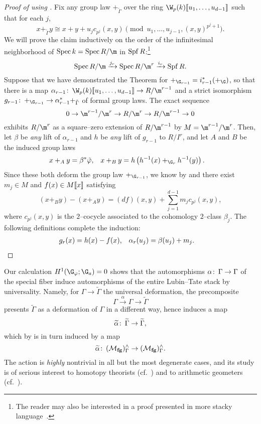 \begin{proof}[{Proof of  using }]
Fix any group law \(+_{\tilde \Gamma}\) over the ring \(\W_p(k)\ps{u_1, \ldots, u_{d-1}}\) such that for each \(j\), \[x +_{\tilde \Gamma} y \cong x + y + u_j c_{p^j}(x, y) \pmod{u_1, \ldots, u_{j-1}, (x, y)^{p^j+1}}.\]  We will prove the claim inductively on the order of the infinitesimal neighborhood of \(\Spec k = \Spec R / \m\) in \(\operatorname{Spf} R\):\footnote{The reader may also be interested in a proof presented in more stacky language~\cite[Reduction to Theorem 21.5]{LurieChromaticCourseNotes}.} \[\Spec R / \m \xrightarrow{j_r} \Spec R/\m^r \xrightarrow{i_r} \Spf R.\]  Suppose that we have demonstrated the Theorem for \(+_{\G_{r-1}} = i_{r-1}^* (+_{\G})\), so that there is a map \(\alpha_{r-1}\co \W_p(k)\ps{u_1, \ldots, u_{d-1}} \to R/\m^{r-1}\) and a strict isomorphism \(g_{r-1}\co +_{\G_{r-1}} \to \alpha_{r-1}^* +_{\tilde \Gamma}\) of formal group laws.  The exact sequence \[0 \to \m^{r-1} / \m^r \to R/\m^r \to R/\m^{r-1} \to 0\] exhibits \(R/\m^r\) as a square--zero extension of \(R/\m^{r-1}\) by \(M = \m^{r-1} / \m^r\).  Then, let \(\beta\) be \emph{any} lift of \(\alpha_{r-1}\) and \(h\) be \emph{any} lift of \(g_{r-1}\) to \(R/I^r\), and let \(A\) and \(B\) be the induced group laws
\begin{align*}
x +_A y & = \beta^* \tilde \phi, &
x +_B y & = h\left( h^{-1}(x) +_{\G_r} h^{-1}(y) \right).
\end{align*}
Since these both deform the group law \(+_{\G_{r-1}}\), we know by  and  there exist \(m_j \in M\) and \(f(x) \in M\llbracket{x}\rrbracket\) satisfying \[(x +_B y) - (x +_A y) = (df)(x, y) + \sum_{j=1}^{d-1} m_j c_{p^j}(x, y),\] where \(c_{p^j}(x, y)\) is the \(2\)--cocycle associated to the cohomology \(2\)--class \(\beta_j\).  The following definitions complete the induction:
\begin{align*}
g_r(x) & = h(x) - f(x), &
\alpha_r(u_j) & = \beta(u_j) + m_j. \qedhere
\end{align*}
\end{proof}

\begin{remark}\label{ActionBySnLiftsToLTn}
Our calculation \(H^1(\G_\phi; \G_a) = 0\) shows that the automorphisms \(\alpha\colon\thinspace \Gamma \to \Gamma\) of the special fiber induce automorphisms of the entire Lubin--Tate stack by universality.  Namely, for \(\Gamma \to \widetilde \Gamma\) the universal deformation, the precomposite \[\Gamma \xrightarrow{\alpha} \Gamma \to \widetilde \Gamma\] presents \(\widetilde \Gamma\) as a deformation of \(\Gamma\) in a different way, hence induces a map \[\widetilde \alpha\colon\thinspace \widetilde \Gamma \to \widetilde \Gamma,\] which by  is in turn induced by a map \[\widetilde \alpha\colon\thinspace (\mathcal{M}_{\mathbf{fg}})^\wedge_\Gamma \to (\mathcal{M}_{\mathbf{fg}})^\wedge_\Gamma.\]  The action is \emph{highly} nontrivial in all but the most degenerate cases, and its study is of serious interest to homotopy theorists (cf.\ ) and to arithmetic geometers (cf.\ ).
\end{remark}

